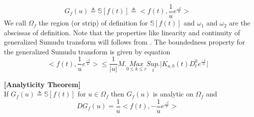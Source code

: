  \begin{equation}
  G_{f}(u)\triangleq \mathbb{S}[f(t)]\triangleq<f(t),\frac{1}{u}e^{\frac{-t}{u}}>
 \end{equation}
 We call $\Omega_{f}$ the region (or strip) of definition for $\mathbb{S}[f(t)]$ and
$\omega_{1}$ and $\omega_{2}$ are the abscissas of definition. Note that the properties like linearity and continuity of generalized Sumudu transform will follows from \cite{R98}.
The boundedness property for the generalized Sumudu transform is given by equation\\
\begin{equation*}
<f(t),\frac{1}{u}e^{\frac{-t}{u}}>  \leq \frac{1}{\vert u \vert}M.\underset{0\leq k\leq r}{Max}\underset{t}{Sup.}\vert K_{a,b}(t)D^{k}_{t}e^{\frac{-t}{u}} \vert
\end{equation*}
\begin{theorem}
\textbf{[Analyticity Theorem]}\\
If $ G_{f}(u)\triangleq \mathbb{S}[f(t)]$ for $u \in\Omega_{f}$ then 
$ G_{f}(u)$ is analytic on $\Omega_{f}$ and 
\begin{equation}
DG_{f}(u)=\frac{1}{u}<f(t),-\frac{1}{u}e^{\frac{-t}{u}}>
\end{equation}
\end{theorem}
